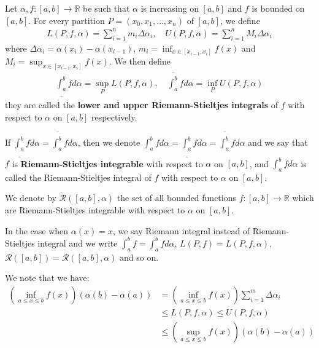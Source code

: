 \documentclass{tufte-handout}
\begin{document}
\begin{Definition}
    Let \( \alpha, f: [a,b] \to \mathbb{R} \) be such that \( \alpha \) 
    is increasing on \([a,b]\) and \( f \) is bounded on \([a,b]\).
    For every partition \( P = (x_0, x_1, \ldots, x_n) \) of \([a,b]\), we define 
    \begin{align}
        L(P, f, \alpha) = \sum_{i=1}^{n}m_i\Delta \alpha_i,\quad 
        U(P, f, \alpha) = \sum_{i=1}^{n}M_i\Delta \alpha_i
    \end{align}
    where \( \Delta \alpha_i  = \alpha(x_i) - \alpha(x_{i-1}) \),
    \(m_i = \inf_{x \in [x_{i-1}, x_i]}f(x)\) and \( M_i = \sup_{x \in [x_{i-1}, x_i]}f(x) \).
    We then define 
    \begin{align}
        \underline{\int_{a}^{b}}fd\alpha = \sup_{P}L(P, f, \alpha),\quad 
        \overline{\int_{a}^{b}}fd\alpha = \inf_{P}U(P, f, \alpha)
    \end{align}
    they are called the \textbf{lower and upper Riemann-Stieltjes integrals} of \( f \) with respect to \( \alpha \) on \([a,b]\) respectively.

    If \( \underline{\int_{a}^{b}}fd\alpha = \overline{\int_{a}^{b}}fd\alpha \), then 
    we denote \(\int_{a}^{b}fd\alpha = \underline{\int_{a}^{b}}fd\alpha = \overline{\int_{a}^{b}}fd\alpha \)
    and we say that \( f \) is \textbf{Riemann-Stieltjes integrable} with respect to \( \alpha \) on \([a,b]\),
    and \( \int_{a}^{b}fd\alpha \) is called the Riemann-Stieltjes integral of \( f \) with respect to \( \alpha \) on \([a,b]\).

    We denote by \( \mathcal{R}([a,b], \alpha) \) the set of all bounded functions
    \( f: [a,b] \to \mathbb{R} \) which are Riemann-Stieltjes integrable with respect to \( \alpha \) on \([a,b]\).

    In the case when \(\alpha(x) = x\), we say Riemann integral instead of Riemann-Stieltjes integral 
    and we write \( \int_{a}^{b}f = \int_{a}^{b}fd\alpha \),
    \( L(P,f) = L(P,f,\alpha) \), \(\mathcal{R}([a,b]) = \mathcal{R}([a,b], \alpha) \) and so on.
\end{Definition}
We note that we have:
\begin{align}
    \left(
        \inf_{a \leq x \leq b} f(x)
    \right)
    \left(
        \alpha(b) - \alpha(a)
    \right)
    &=
    \left(
        \inf_{a \leq x \leq b} f(x)
    \right)\sum_{i=1}^{m}\Delta \alpha_i\\
    &\leq L(P, f, \alpha) \leq U(P, f, \alpha)\\
    &\leq 
    \left(\sup_{a \leq x \leq b} f(x)
    \right)\left(
        \alpha(b) - \alpha(a)
    \right)
\end{align}
\end{document}
